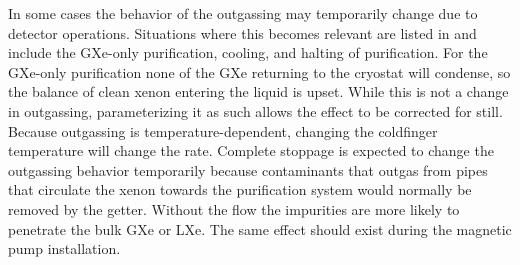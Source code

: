 In some cases the behavior of the outgassing may temporarily change due to detector operations.  Situations where this becomes relevant
are listed in  and include the GXe-only purification,  cooling, and
halting of purification.  For the GXe-only purification none of the GXe returning to the cryostat will condense,
so the balance of clean xenon entering the liquid is upset.  While this is not a change in outgassing, parameterizing it as such allows the
effect to be corrected for still.  Because outgassing is temperature-dependent, changing the  coldfinger temperature will change
the rate.  Complete stoppage is expected to change the outgassing behavior temporarily because
contaminants that outgas from pipes that circulate the xenon towards the purification system would normally be removed by the
getter.  Without the flow the impurities are more likely to penetrate the bulk GXe or LXe.  The same effect should exist during the magnetic
pump installation.

\bgroup
\def\arraystretch{1.2}
\begin{table}
\centering
{}
\caption{Fraction of outgassing during periods where system conditions changed.  Medians and 68\% credible intervals are listed, along
with change in conditions.}
\label{tab:elifetime_fit_results_outgassing_changes}
\end{table}
\egroup

